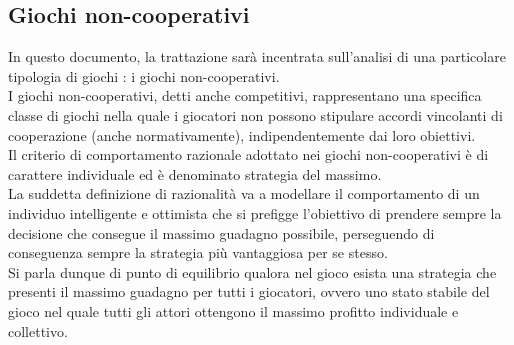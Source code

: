\subsection{Giochi non-cooperativi}
\justify
In questo documento, la trattazione sarà incentrata sull'analisi di una particolare tipologia di giochi : i giochi non-cooperativi.\\
I giochi non-cooperativi, detti anche competitivi, rappresentano una specifica classe di giochi nella quale i giocatori non possono stipulare accordi vincolanti di cooperazione (anche normativamente), indipendentemente dai loro obiettivi.\\
Il criterio di comportamento razionale adottato nei giochi non-cooperativi è di carattere individuale ed è denominato strategia del massimo.\\
La suddetta definizione di razionalità va a modellare il comportamento di un individuo intelligente e ottimista che si prefigge l'obiettivo di prendere sempre la decisione che consegue il massimo guadagno possibile, perseguendo di conseguenza sempre la strategia più vantaggiosa per se stesso.\\
Si parla dunque di punto di equilibrio qualora nel gioco esista una strategia che presenti il massimo guadagno per tutti i giocatori, ovvero uno stato stabile del gioco nel quale tutti gli attori ottengono il massimo profitto individuale e collettivo.\newline

